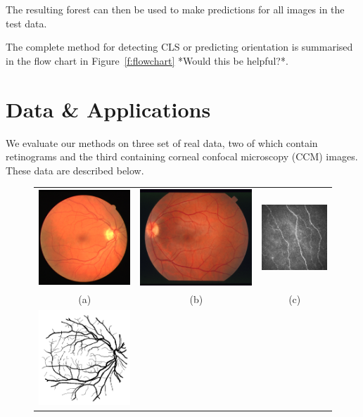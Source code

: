 \documentclass{IEEEtran}
\newcommand{\fref}[1]{Figure~\ref{#1}}
\begin{document}
The resulting forest can then be used to make predictions for all images in the test data.

The complete method for detecting CLS or predicting orientation is summarised in the flow chart in \fref{f:flowchart} *Would this be helpful?*.

\section{Data \& Applications}
\label{s:data}
We evaluate our methods on three set of real data, two of which contain retinograms and the third containing corneal confocal microscopy (CCM) images. These data are described below.

\begin{figure}[t]
\centering
\begin{tabular}{@{}c c c@{}} %
\includegraphics[width=0.3\columnwidth]{figs/retina/02_test} &
\includegraphics[width=0.3\columnwidth]{figs/retina/17_stare} &
\includegraphics[width=0.3\columnwidth]{figs/fibre/04_fibre_ccm} \\
(a) & (b) & (c) \\
\includegraphics[width=0.3\columnwidth]{figs/retina/02_manual1} &

\end{tabular}
\end{figure}
\end{document}
